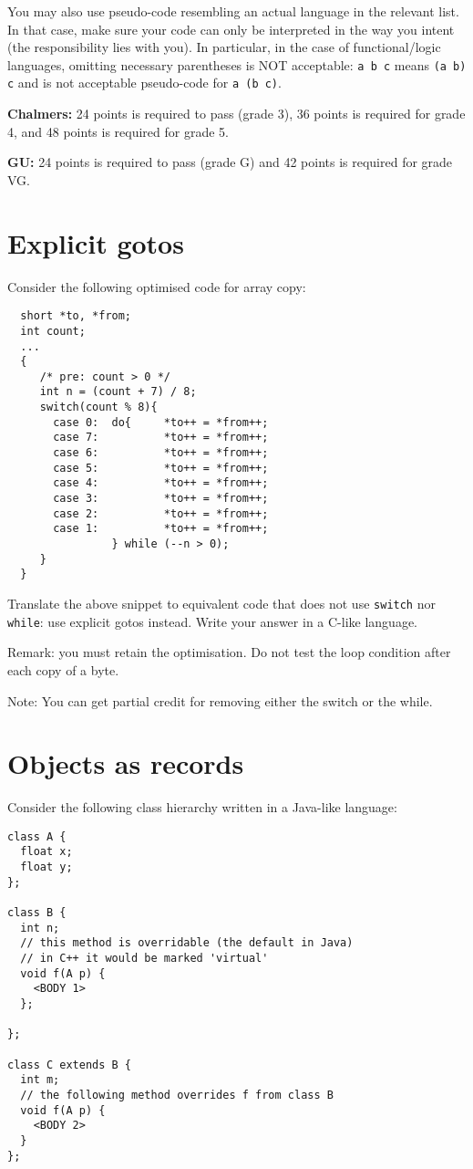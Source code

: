 \documentclass{article}
\begin{document}
You may also use pseudo-code resembling an actual language in the
relevant list. In that case, make sure your code can only be
interpreted in the way you intent (the responsibility lies with
you). In particular, in the case of functional/logic languages,
omitting necessary parentheses is NOT acceptable: \texttt{a b c} means
\texttt{(a b) c} and is not acceptable pseudo-code for \texttt{a (b
  c)}.


\textbf{Chalmers:}
24 points is required to pass (grade 3), 36 points is required for
grade 4, and 48 points is required for grade 5.

\textbf{GU:}
24 points is required to pass (grade G) and 42 points is
required for grade VG.

\section{Explicit gotos}

Consider the following optimised code for array copy:
\begin{verbatim}
  short *to, *from;
  int count;
  ...
  {
     /* pre: count > 0 */
     int n = (count + 7) / 8;
     switch(count % 8){
       case 0:	do{     *to++ = *from++;
       case 7:	        *to++ = *from++;
       case 6:	        *to++ = *from++;
       case 5:	        *to++ = *from++;
       case 4:	        *to++ = *from++;
       case 3:	        *to++ = *from++;
       case 2:	        *to++ = *from++;
       case 1:	        *to++ = *from++;
                } while (--n > 0);
     }
  }
\end{verbatim}

Translate the above snippet to equivalent code that does not use
\texttt{switch} nor \texttt{while}: use explicit gotos instead.
Write your answer in a C-like language.

Remark: you must retain the optimisation. Do not test the loop
condition after each copy of a byte.

Note: You can get partial credit for removing either the switch or the
while.
\newpage
\section{Objects as records}

Consider the following class hierarchy written in a Java-like
language:
\begin{verbatim}
class A {
  float x;
  float y;
};

class B {
  int n;
  // this method is overridable (the default in Java)
  // in C++ it would be marked 'virtual'
  void f(A p) {
    <BODY 1>
  };

};

class C extends B {
  int m;
  // the following method overrides f from class B
  void f(A p) {
    <BODY 2>
  }
};
\end{verbatim}
\end{document}
